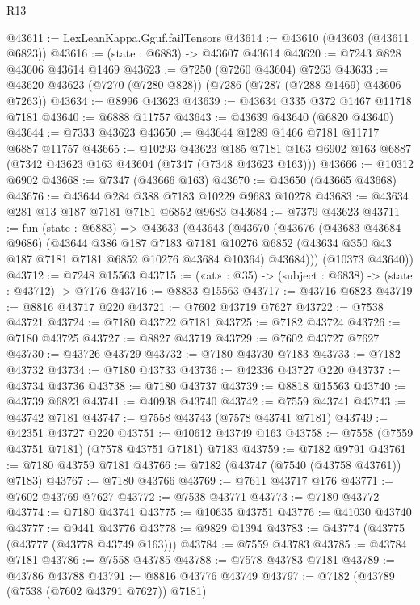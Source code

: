 \begin{lexlean}{R13}
\begin{coremodule}
@43611 := LexLeanKappa.Gguf.failTensors
@43614 := @43610 (@43603 (@43611 @6823))
@43616 := (state : @6883) -> @43607 @43614
@43620 := @7243 @828 @43606 @43614 @1469
@43623 := @7250 (@7260 @43604) @7263
@43633 := @43620 @43623 (@7270 (@7280 @828)) (@7286 (@7287 (@7288 @1469) @43606 @7263))
@43634 := @8996 @43623
@43639 := @43634 @335 @372 @1467 @11718 @7181
@43640 := @6888 @11757
@43643 := @43639 @43640 (@6820 @43640)
@43644 := @7333 @43623
@43650 := @43644 @1289 @1466 @7181 @11717 @6887 @11757
@43665 := @10293
    @43623
    @185
    @7181
    @163
    @6902
    @163
    @6887
    (@7342 @43623 @163 @43604 (@7347 (@7348 @43623 @163)))
@43666 := @10312 @6902
@43668 := @7347 (@43666 @163)
@43670 := @43650 (@43665 @43668)
@43676 := @43644 @284 @388 @7183 @10229 @9683 @10278
@43683 := @43634 @281 @13 @187 @7181 @7181 @6852 @9683
@43684 := @7379 @43623
@43711 := fun (state : @6883) =>
  @43633
    (@43643
      (@43670
        (@43676
          (@43683 @43684 @9686)
          (@43644
            @386
            @187
            @7183
            @7181
            @10276
            @6852
            (@43634 @350 @43 @187 @7181 @7181 @6852 @10276 @43684 @10364)
            @43684)))
      (@10373 @43640))
@43712 := @7248 @15563
@43715 := («at» : @35) -> (subject : @6838) -> (state : @43712) -> @7176
@43716 := @8833 @15563
@43717 := @43716 @6823
@43719 := @8816 @43717 @220
@43721 := @7602 @43719 @7627
@43722 := @7538 @43721
@43724 := @7180 @43722 @7181
@43725 := @7182 @43724
@43726 := @7180 @43725
@43727 := @8827 @43719
@43729 := @7602 @43727 @7627
@43730 := @43726 @43729
@43732 := @7180 @43730 @7183
@43733 := @7182 @43732
@43734 := @7180 @43733
@43736 := @42336 @43727 @220
@43737 := @43734 @43736
@43738 := @7180 @43737
@43739 := @8818 @15563
@43740 := @43739 @6823
@43741 := @40938 @43740
@43742 := @7559 @43741
@43743 := @43742 @7181
@43747 := @7558 @43743 (@7578 @43741 @7181)
@43749 := @42351 @43727 @220
@43751 := @10612 @43749 @163
@43758 := @7558 (@7559 @43751 @7181) (@7578 @43751 @7181) @7183
@43759 := @7182 @9791
@43761 := @7180 @43759 @7181
@43766 := @7182 (@43747 (@7540 (@43758 @43761)) @7183)
@43767 := @7180 @43766
@43769 := @7611 @43717 @176
@43771 := @7602 @43769 @7627
@43772 := @7538 @43771
@43773 := @7180 @43772
@43774 := @7180 @43741
@43775 := @10635 @43751
@43776 := @41030 @43740
@43777 := @9441 @43776
@43778 := @9829 @1394
@43783 := @43774 (@43775 (@43777 (@43778 @43749 @163)))
@43784 := @7559 @43783
@43785 := @43784 @7181
@43786 := @7558 @43785
@43788 := @7578 @43783 @7181
@43789 := @43786 @43788
@43791 := @8816 @43776 @43749
@43797 := @7182 (@43789 (@7538 (@7602 @43791 @7627)) @7181)

\end{coremodule}
\end{lexlean}
